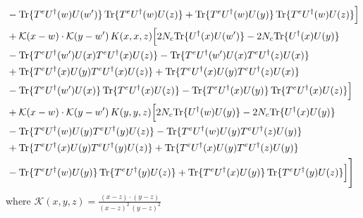 \documentclass[9pt]{article}
\numberwithin{equation}{section}
\begin{document}
\begin{align}
&-{\rm Tr}\{T^eU^\dagger(w)U(w')\}\,{\rm Tr}\{T^eU^\dagger(w)U(z)\}+{\rm Tr}\{T^eU^\dagger(w)U(y)\}\,{\rm Tr}\{T^eU^\dagger(w)U(z)\}\Big]\notag\\
&+\mathcal K(x-w)\cdot\mathcal K(y-w')\,K(x,x,z)\Big[2 N_{c}{\rm Tr}\{U^\dagger(x)U(w')\}-2 N_{c}{\rm Tr}\{U^\dagger(x)U(y)\}\notag\\
&-{\rm Tr}\{T^eU^\dagger(w')U(x)T^eU^\dagger(x)U(z)\}-{\rm Tr}\{T^eU^\dagger(w')U(x)T^eU^\dagger(z)U(x)\}\notag\\
&+{\rm Tr}\{T^eU^\dagger(x)U(y)T^eU^\dagger(x)U(z)\}+{\rm Tr}\{T^eU^\dagger(x)U(y)T^eU^\dagger(z)U(x)\}\notag\\
&-{\rm Tr}\{T^eU^\dagger(w')U(x)\}\,{\rm Tr}\{T^eU^\dagger(x)U(z)\}-{\rm Tr}\{T^eU^\dagger(x)U(y)\}\,{\rm Tr}\{T^eU^\dagger(x)U(z)\}\Big]\notag\\
&+\mathcal K(x-w)\cdot\mathcal K(y-w')\,K(y,y,z)\Big[2 N_{c}{\rm Tr}\{U^\dagger(w)U(y)\}-2 N_{c}{\rm Tr}\{U^\dagger(x)U(y)\}\notag\\
&-{\rm Tr}\{T^eU^\dagger(w)U(y)T^eU^\dagger(y)U(z)\}-{\rm Tr}\{T^eU^\dagger(w)U(y)T^eU^\dagger(z)U(y)\}\notag\\
&+{\rm Tr}\{T^eU^\dagger(x)U(y)T^eU^\dagger(y)U(z)\}+{\rm Tr}\{T^eU^\dagger(x)U(y)T^eU^\dagger(z)U(y)\}\notag\\
&-{\rm Tr}\{T^eU^\dagger(w)U(y)\}\,{\rm Tr}\{T^eU^\dagger(y)U(z)\}+{\rm Tr}\{T^eU^\dagger(x)U(y)\}\,{\rm Tr}\{T^eU^\dagger(y)U(z)\}\Big]\Bigg]
\end{align}
where $\mathcal{K}(x,y,z) = \frac{(x-z)\cdot (y-z)}{(x-z)^{2}\,(y-z)^{2}}$
\end{document}
